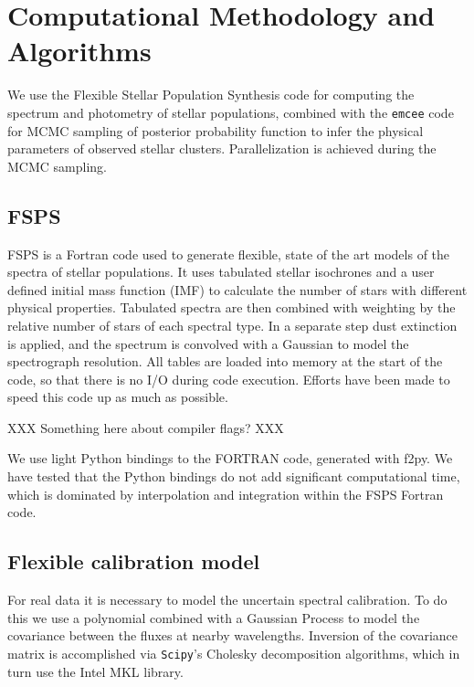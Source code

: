 \documentclass{article}
\begin{document}
\section{ Computational Methodology and Algorithms}
We use the Flexible Stellar Population Synthesis \citep[FSPS][]{fsps} code for computing the spectrum and photometry of stellar populations, combined with the \texttt{emcee} code for MCMC sampling of posterior probability function to infer the physical parameters of observed stellar clusters.  Parallelization is achieved during the MCMC sampling.

\subsection{FSPS}
FSPS is a Fortran code used to generate flexible, state of the art models of the spectra of stellar populations.  It uses tabulated stellar isochrones and a user defined initial mass function (IMF) to calculate the number of stars with different physical properties.  Tabulated spectra are then combined with weighting by the relative number of stars of each spectral type.  In a separate step dust extinction is applied, and the spectrum is convolved with a Gaussian to model the spectrograph resolution.  All tables are loaded into memory at the start of the code, so that there is no I/O during code execution.  Efforts have been made to speed this code up as much as possible.

XXX Something here about compiler flags? XXX

We use light Python bindings to the FORTRAN code, generated with f2py.  We have tested that the Python bindings do not add significant computational time, which is dominated by interpolation and integration within the FSPS Fortran code.

\subsection{Flexible calibration model}
For real data it is necessary to model the uncertain spectral calibration.  To do this we use a polynomial combined with a Gaussian Process \citep[e.g.,][]{RW} to model the covariance between the fluxes at nearby wavelengths.  Inversion of the covariance matrix is accomplished via \texttt{Scipy}'s Cholesky decomposition algorithms, which in turn use the Intel MKL library.
\end{document}
